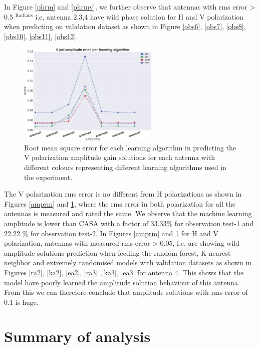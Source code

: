 In Figure \ref{phrm} and \ref{phrmv}, we further observe that antennas with rms error > 0.5 $^\mathrm{Radians}$ i.e, antenna 2,3,4 have wild phase solution for H and V polarization when predicting on validation dataset as shown in Figure \ref{obs6}, \ref{obs7}, \ref{obs8},\ref{obs10}, \ref{obs11}, \ref{obs12}. 
\begin{figure}[H]
  \centering
    \includegraphics[width=0.6\textwidth]{images/Vpol-amp.eps}
    \caption{Root mean square error for each learning algorithm in predicting the V polarization amplitude gain solutions for each antenna with different colours representing different learning algorithms used in the experiment.}
  \label{amprmv}
 \end{figure} 

The V polarization rms error is no different from H polarizations as shown in Figures \ref{amprm} and \ref{amprmv}, where the rms error in both polarization for all the antennas is measured and rated the same. We observe that the machine learning amplitude is lower than CASA with a factor of 33.33$\%$ for observation test-1 and 22.22 $\%$ for observation test-2. In Figures \ref{amprm} and \ref{amprmv} for H and V polarization, antennas with measured rms error > 0.05, i.e, are showing wild amplitude solutions prediction when feeding the random forest, K-nearest neighbor and extremely randomised models with validation datasets as shown in Figures  \ref{ra2}, \ref{ka2}, \ref{ea2}, \ref{ra3} ,\ref{ka3}, \ref{ea3} for antenna 4. This shows that the model have poorly learned the amplitude solution behaviour of this antenna. From this we can therefore conclude that amplitude solutions with rms error of 0.1 is huge.

\section{Summary of analysis}

